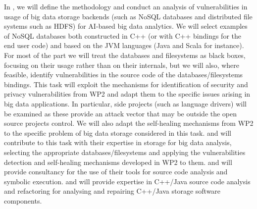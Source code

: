 \begin{Workpackage}{\thewpno}
\begin{Task}
\TaskResults{%
\ref{del:bigdata1},
\ref{del:bigdata2},
\ref{del:bigdata3}
}
\TaskHeader{}
In \theTask, we will define the methodology and conduct an analysis of vulnerabilities in usage of big data storage backends (such as NoSQL databases and distributed file systems such as HDFS) for AI-based big data analytics.  We will select examples of NoSQL databases both constructed in C++ (or with C++ bindings for the end user code) and based on the JVM languages (Java and Scala for instance). For most of the part we will treat the databases and filesystems as black boxes, focusing on their usage rather than on their internals, but we will also, where feasible, identify vulnerabilities in the source code of the databases/filesystems bindings. This task will exploit the mechanisms for identification of security and privacy vulnerabilities from WP2 and adapt them to the specific issues arising in big data applications. In particular, side projects (such as language drivers) will be examined as these provide an attack vector that may be outside the open source projects control. We will also adapt the self-healing mechanisms from WP2 to the specific problem of big data storage considered in this task. 
\UODshort{} and \SOPRAshort{} will contribute to this task with their expertise in storage for big data analysis, selecting the appropriate databases/filesystems and applying the vulnerabilities detection and self-healing mechanisms developed in WP2 to them. 
\IBMshort{} and \YAGshort{} will provide consultancy for the use of their tools for source code analysis and symbolic execution. 
\UCMshort{} and \USTANshort{} will provide expertise in C++/Java source code analysis and refactoring for analysing and repairing C++/Java storage software components.
 \end{Task}


\end{Workpackage}
